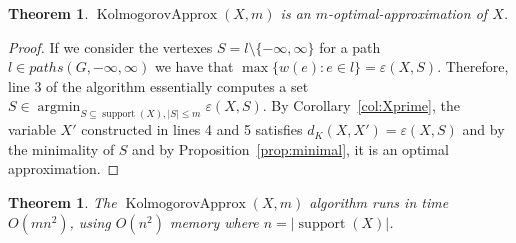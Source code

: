 \documentclass{article}
\newtheorem{theorem}[thm]{Theorem}
\DeclareMathOperator{\support}{support}
\DeclareMathOperator{\KlmApprox}{KolmogorovApprox}
\begin{document}
%	
%	
%	
%		
%	

\begin{theorem}\label{the:algo}
	$\KlmApprox(X,m)$ is an $m$-optimal-approximation of $X$.
\end{theorem}
\begin{proof}
If we consider the vertexes $S= l \setminus \{-\infty,\infty\}$ for a path $l \in paths(G,-\infty,\infty)$ we have that $\max \{ w(e)\colon e \in l  \} = \varepsilon(X,S)$. Therefore, line 3 of the algorithm essentially computes a set $S \in \operatorname{argmin}_{S \subseteq \support(X), |S|\leq m} \varepsilon(X,S)$. By Corollary~\ref{col:Xprime}, the variable $X'$ constructed in lines 4 and 5 satisfies $d_K(X,X') = \varepsilon(X,S)$ and by the minimality of $S$ and by Proposition~\ref{prop:minimal}, it is an optimal approximation.
\end{proof}


\begin{theorem}\label{the:complexity}
	The $\KlmApprox(X,m)$ algorithm runs in time $O(mn^2)$, using $O(n^2)$ memory where $n=|\support(X)|$.
\end{theorem}
\end{document}
